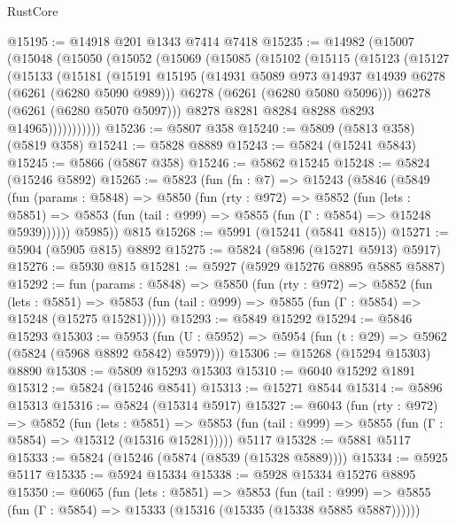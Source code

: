 \begin{lexlean}{RustCore}
\begin{coremodule}
@15195 := @14918 @201 @1343 @7414 @7418
@15235 := @14982
    (@15007
      (@15048
        (@15050
          (@15052
            (@15069
              (@15085
                (@15102
                  (@15115
                    (@15123
                      (@15127
                        (@15133
                          (@15181
                            (@15191
                              @15195
                              (@14931 @5089 @973 @14937 @14939 @6278 (@6261 (@6280 @5090 @989)))
                              @6278
                              (@6261 (@6280 @5080 @5096)))
                            @6278
                            (@6261 (@6280 @5070 @5097)))
                          @8278
                          @8281
                          @8284
                          @8288
                          @8293
                          @14965)))))))))))
@15236 := @5807 @358
@15240 := @5809 (@5813 @358) (@5819 @358)
@15241 := @5828 @8889
@15243 := @5824 (@15241 @5843)
@15245 := @5866 (@5867 @358)
@15246 := @5862 @15245
@15248 := @5824 (@15246 @5892)
@15265 := @5823
    (fun (fn : @7) =>
    @15243
      (@5846
        (@5849
          (fun (params : @5848) =>
          @5850
            (fun (rty : @972) =>
            @5852
              (fun (lets : @5851) =>
              @5853 (fun (tail : @999) => @5855 (fun (Γ : @5854) => @15248 @5939))))))
        @5985))
    @815
@15268 := @5991 (@15241 (@5841 @815))
@15271 := @5904 (@5905 @815) @8892
@15275 := @5824 (@5896 (@15271 @5913) @5917)
@15276 := @5930 @815
@15281 := @5927 (@5929 @15276 @8895 @5885 @5887)
@15292 := fun (params : @5848) =>
  @5850
    (fun (rty : @972) =>
    @5852
      (fun (lets : @5851) =>
      @5853 (fun (tail : @999) => @5855 (fun (Γ : @5854) => @15248 (@15275 @15281)))))
@15293 := @5849 @15292
@15294 := @5846 @15293
@15303 := @5953
    (fun (U : @5952) => @5954 (fun (t : @29) => @5962 (@5824 (@5968 @8892 @5842) @5979)))
@15306 := @15268 (@15294 @15303) @8890
@15308 := @5809 @15293 @15303
@15310 := @6040 @15292 @1891
@15312 := @5824 (@15246 @8541)
@15313 := @15271 @8544
@15314 := @5896 @15313
@15316 := @5824 (@15314 @5917)
@15327 := @6043
    (fun (rty : @972) =>
    @5852
      (fun (lets : @5851) =>
      @5853 (fun (tail : @999) => @5855 (fun (Γ : @5854) => @15312 (@15316 @15281)))))
    @5117
@15328 := @5881 @5117
@15333 := @5824 (@15246 (@5874 (@8539 (@15328 @5889))))
@15334 := @5925 @5117
@15335 := @5924 @15334
@15338 := @5928 @15334 @15276 @8895
@15350 := @6065
    (fun (lets : @5851) =>
    @5853
      (fun (tail : @999) =>
      @5855 (fun (Γ : @5854) => @15333 (@15316 (@15335 (@15338 @5885 @5887))))))

\end{coremodule}
\end{lexlean}
